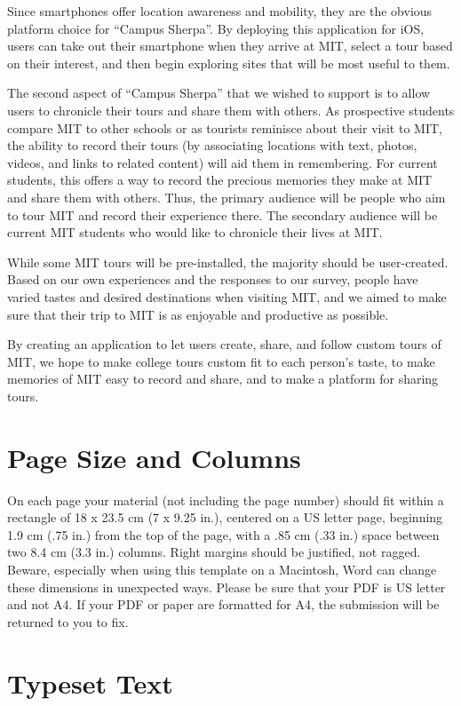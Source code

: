\documentclass{sigchi}
\begin{document}
Since smartphones offer location awareness and mobility, they are the obvious platform choice for ``Campus Sherpa''. By deploying this application for iOS, users can take out their smartphone when they arrive at MIT, select a tour based on their interest, and then begin exploring sites that will be most useful to them.

The second aspect of ``Campus Sherpa'' that we wished to support is to allow users to chronicle their tours and share them with others. As prospective students compare MIT to other schools or as tourists reminisce about their visit to MIT, the ability to record their tours (by associating locations with text, photos, videos, and links to related content) will aid them in remembering. For current students, this offers a way to record the precious memories they make at MIT and share them with others. Thus, the primary audience will be people who aim to tour MIT and record their experience there. The secondary audience will be current MIT students who would like to chronicle their lives at MIT.

While some MIT tours will be pre-installed, the majority should be user-created.
Based on our own experiences and the responses to our survey, people have varied tastes and desired destinations when visiting MIT, and we aimed to make sure that their trip to MIT is as enjoyable and productive as possible.

By creating an application to let users create, share, and follow custom tours of MIT, we hope to make college tours custom fit to each person’s taste, to make memories of MIT easy to record and share, and to make a platform for sharing tours.

\section{Page Size and Columns}

On each page your material (not including the page number) should fit
within a rectangle of 18 x 23.5 cm (7 x 9.25 in.), centered on a US
letter page, beginning 1.9 cm (.75 in.) from the top of the page, with
a .85 cm (.33 in.) space between two 8.4 cm (3.3 in.) columns.  Right
margins should be justified, not ragged. Beware, especially when using
this template on a Macintosh, Word can change these dimensions in
unexpected ways. Please be sure that your PDF is US letter and not
A4. If your PDF or paper are formatted for A4, the submission will be
returned to you to fix.

\section{Typeset Text}
\end{document}
